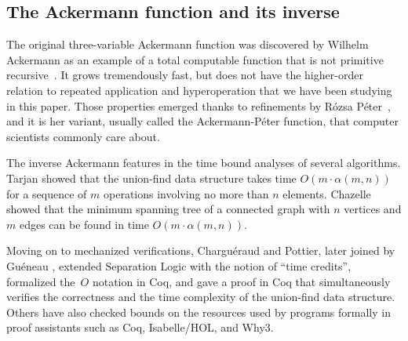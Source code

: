 \subsection{The Ackermann function and its inverse}
The original three-variable Ackermann function was discovered by
Wilhelm Ackermann as an example of a total computable function that
is not primitive recursive~\cite{ackermann}.
It grows tremendously fast, but does not have the higher-order
relation to repeated application and hyperoperation that we have been studying in
this paper. Those properties emerged thanks to refinements by Rózsa Péter~\cite{peter},
and it is her variant, usually called the Ackermann-Péter function, 
that computer scientists commonly care about.

The inverse Ackermann
features in the time bound analyses of several algorithms.
Tarjan \cite{tarjan} showed that the union-find data structure
takes time $O(m\cdot\alpha(m,n))$ for a sequence of $m$ operations
involving no more than $n$ elements. 
Chazelle \cite{chazelle} showed that the minimum spanning tree
of a connected graph with $n$ vertices and $m$ edges
can be found in time $O(m\cdot\alpha(m,n))$.

Moving on to mechanized verifications, Charguéraud and Pottier, 
later joined by Guéneau \cite{charpott,gueneauetal},
extended Separation Logic with the notion of ``time credits'',
formalized the~$O$ notation in Coq,
and gave a proof in Coq that simultaneously verifies the correctness
and the time complexity of the union-find data structure. Others
\cite{others2,others4,others3,others1}
have also checked bounds on the resources
used by programs formally in proof assistants such as Coq, Isabelle/HOL, and Why3.

